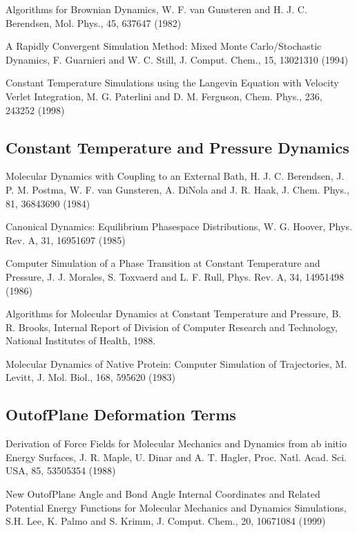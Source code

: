 \documentclass[letterpaper,11pt,english]{sphinxmanual}
\begin{document}
Algorithms for Brownian Dynamics, W. F. van Gunsteren and H. J. C. Berendsen, Mol. Phys., 45, 637\sphinxhyphen{}647 (1982)

A Rapidly Convergent Simulation Method: Mixed Monte Carlo/Stochastic Dynamics, F. Guarnieri and W. C. Still, J. Comput. Chem., 15, 1302\sphinxhyphen{}1310 (1994)

Constant Temperature Simulations using the Langevin Equation with Velocity Verlet Integration, M. G. Paterlini and D. M. Ferguson, Chem. Phys., 236, 243\sphinxhyphen{}252 (1998)


\subsection{Constant Temperature and Pressure Dynamics}
\label{\detokenize{text/references:constant-temperature-and-pressure-dynamics}}
Molecular Dynamics with Coupling to an External Bath, H. J. C. Berendsen, J. P. M. Postma, W. F. van Gunsteren, A. DiNola and J. R. Haak, J. Chem. Phys., 81, 3684\sphinxhyphen{}3690 (1984)

Canonical Dynamics: Equilibrium Phase\sphinxhyphen{}space Distributions, W. G. Hoover, Phys. Rev. A, 31, 1695\sphinxhyphen{}1697 (1985)

Computer Simulation of a Phase Transition at Constant Temperature and Pressure, J. J. Morales, S. Toxvaerd and L. F. Rull, Phys. Rev. A, 34, 1495\sphinxhyphen{}1498 (1986)

Algorithms for Molecular Dynamics at Constant Temperature and Pressure, B. R. Brooks, Internal Report of Division of Computer Research and Technology, National Institutes of Health, 1988.

Molecular Dynamics of Native Protein: Computer Simulation of Trajectories, M. Levitt, J. Mol. Biol., 168, 595\sphinxhyphen{}620 (1983)


\subsection{Out\sphinxhyphen{}of\sphinxhyphen{}Plane Deformation Terms}
\label{\detokenize{text/references:out-of-plane-deformation-terms}}
Derivation of Force Fields for Molecular Mechanics and Dynamics from ab initio Energy Surfaces, J. R. Maple, U. Dinar and A. T. Hagler, Proc. Natl. Acad. Sci. USA, 85, 5350\sphinxhyphen{}5354 (1988)

New Out\sphinxhyphen{}of\sphinxhyphen{}Plane Angle and Bond Angle Internal Coordinates and Related Potential Energy Functions for Molecular Mechanics and Dynamics Simulations, S.\sphinxhyphen{}H. Lee, K. Palmo and S. Krimm, J. Comput. Chem., 20, 1067\sphinxhyphen{}1084 (1999)
\end{document}
